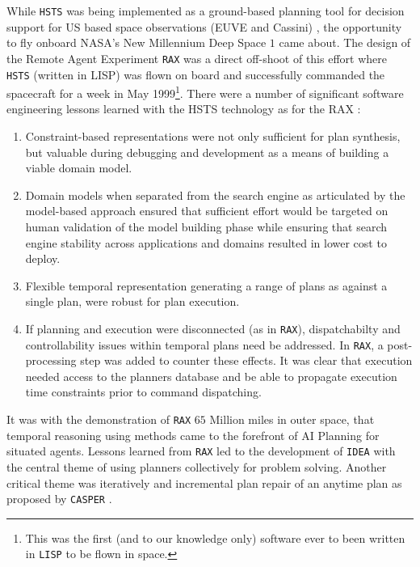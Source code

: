 While \texttt{HSTS} \cite{mus94} was being implemented as a
ground-based planning tool for decision support for US based space
observations (EUVE and Cassini) \cite{mus95}, the opportunity to fly
onboard NASA’s New Millennium Deep Space $1$ came about. The design of
the Remote Agent Experiment \texttt{RAX} \cite{pell97, bernard98,
  pell98, mus98, DS1report, rajan00, jonsson00} was a direct off-shoot
of this effort where \texttt{HSTS} (written in LISP) was flown on
board and successfully commanded the spacecraft for a week in May
1999\footnote{This was the first (and to our knowledge only) software
  ever to been written in \texttt{LISP} to be flown in space.}. There
were a number of significant software engineering lessons learned with
the HSTS technology as  for the RAX
:

\begin{enumerate}

\item Constraint-based representations were not only sufficient for
  plan synthesis, but valuable during debugging and development as a
  means of building a viable domain model.

\item Domain models when separated from the search engine as
  articulated by the model-based approach \cite{williams96a} ensured
  that sufficient effort would be targeted on human validation of the
  model building phase while ensuring that search engine stability
  across applications and domains resulted in lower cost to deploy.

\item Flexible temporal representation generating a range of plans as
  against a single plan, were robust for  plan
  execution.

\item If planning and execution were disconnected (as in
  \texttt{RAX}), dispatchabilty \cite{mus98a} and controllability
  \cite{morris00} issues within temporal plans need be addressed. In
  \texttt{RAX}, a post-processing step was added to counter these
  effects. It was clear that execution needed access to the planners
  database and be able to propagate execution time constraints prior
  to command dispatching.

\end{enumerate}

It was with the demonstration of \texttt{RAX} $65$ Million miles in
outer space, that temporal reasoning using  methods
came to the forefront of AI Planning for situated agents. Lessons
learned from \texttt{RAX} led to the development of \texttt{IDEA}
\cite{mus02,mus04,Dias:2003ua,mus06} with the central theme of using
planners collectively for problem solving. Another critical theme was
iteratively and incremental plan repair of an anytime plan
\cite{Zaimag96} as proposed by \texttt{CASPER} \cite{chien00}.

